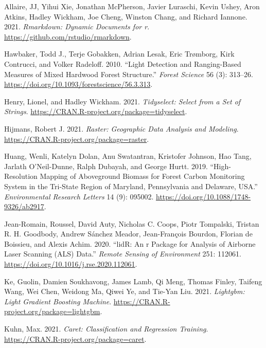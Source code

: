 \documentclass[]{elsarticle} %
\newlength{\cslhangindent}
\newenvironment{CSLReferences}[2] %
 {%
  \setlength{\parindent}{0pt}
  \ifodd #1 \everypar{\setlength{\hangindent}{\cslhangindent}}\ignorespaces\fi
  \ifnum #2 > 0
  \setlength{\parskip}{#2\baselineskip}
  \fi
 }%
 {}
\begin{document}
\hypertarget{refs}{}
\begin{CSLReferences}{1}{0}
\leavevmode{}%
Allaire, JJ, Yihui Xie, Jonathan McPherson, Javier Luraschi, Kevin Ushey, Aron Atkins, Hadley Wickham, Joe Cheng, Winston Chang, and Richard Iannone. 2021. \emph{Rmarkdown: Dynamic Documents for r}. \url{https://github.com/rstudio/rmarkdown}.

\leavevmode{}%
Hawbaker, Todd J., Terje Gobakken, Adrian Lesak, Eric Trømborg, Kirk Contrucci, and Volker Radeloff. 2010. {``{Light Detection and Ranging-Based Measures of Mixed Hardwood Forest Structure}.''} \emph{Forest Science} 56 (3): 313--26. \url{https://doi.org/10.1093/forestscience/56.3.313}.

\leavevmode{}%
Henry, Lionel, and Hadley Wickham. 2021. \emph{Tidyselect: Select from a Set of Strings}. \url{https://CRAN.R-project.org/package=tidyselect}.

\leavevmode{}%
Hijmans, Robert J. 2021. \emph{Raster: Geographic Data Analysis and Modeling}. \url{https://CRAN.R-project.org/package=raster}.

\leavevmode{}%
Huang, Wenli, Katelyn Dolan, Anu Swatantran, Kristofer Johnson, Hao Tang, Jarlath O'Neil-Dunne, Ralph Dubayah, and George Hurtt. 2019. {``High-Resolution Mapping of Aboveground Biomass for Forest Carbon Monitoring System in the Tri-State Region of Maryland, Pennsylvania and Delaware, {USA}.''} \emph{Environmental Research Letters} 14 (9): 095002. \url{https://doi.org/10.1088/1748-9326/ab2917}.

\leavevmode{}%
Jean-Romain, Roussel, David Auty, Nicholas C. Coops, Piotr Tompalski, Tristan R. H. Goodbody, Andrew Sánchez Meador, Jean-François Bourdon, Florian de Boissieu, and Alexis Achim. 2020. {``lidR: An r Package for Analysis of Airborne Laser Scanning (ALS) Data.''} \emph{Remote Sensing of Environment} 251: 112061. \url{https://doi.org/10.1016/j.rse.2020.112061}.

\leavevmode{}%
Ke, Guolin, Damien Soukhavong, James Lamb, Qi Meng, Thomas Finley, Taifeng Wang, Wei Chen, Weidong Ma, Qiwei Ye, and Tie-Yan Liu. 2021. \emph{Lightgbm: Light Gradient Boosting Machine}. \url{https://CRAN.R-project.org/package=lightgbm}.

\leavevmode{}%
Kuhn, Max. 2021. \emph{Caret: Classification and Regression Training}. \url{https://CRAN.R-project.org/package=caret}.


\end{CSLReferences}
\end{document}
